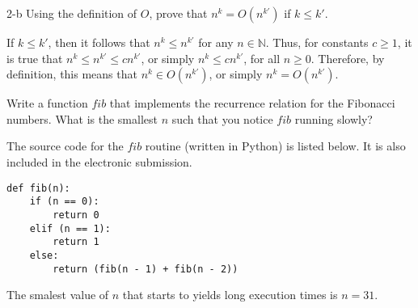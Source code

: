 \documentclass[11pt]{article}
\begin{document}
\begin{prob}{2-b}
Using the definition of $O$, prove that $n^{k} = O(n^{k'})$ if $k \leq k'$.
\end{prob}
\begin{sol} 

If $k \leq k'$, then it follows that $n^{k} \leq n^{k'}$ for any $n \in \mathbb{N}$. Thus, for constants $c \geq 1$, it is true that $n^{k} \leq n^{k'} \leq cn^{k'}$, or simply $n^{k} \leq cn^{k'}$, for all $n \geq 0$. Therefore, by definition, this means that $n^{k} \in O(n^{k'})$, or simply $n^{k} = O(n^{k'})$.

\end{sol}

\begin{prob}{3}
Write a function $fib$ that implements the recurrence relation for the Fibonacci numbers. What is the smallest $n$ such that you notice $fib$ running slowly?
\end{prob}
\begin{sol} 
The source code for the $fib$ routine (written in Python) is listed below. It is also included in the electronic submission.

\begin{lstlisting}
def fib(n):
	if (n == 0):
		return 0
	elif (n == 1):
		return 1
	else:
		return (fib(n - 1) + fib(n - 2))
\end{lstlisting}

The smalest value of $n$ that starts to yields long execution times is $n = 31$.

\end{sol}
\end{document}

